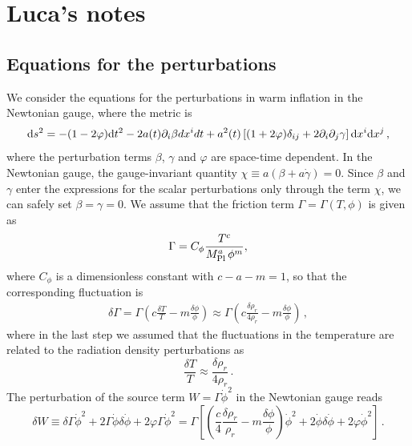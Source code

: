 \section{Luca's notes}

\subsection{Equations for the perturbations}

We consider the equations for the perturbations in warm inflation in the Newtonian gauge, where the metric is
\begin{equation}
    {\rm d}s^2 = -(1 - 2\varphi){\rm d}t^2 - 2 a(t) \partial_i\beta dx^i dt + a^2(t)\left[ (1+2\varphi)\delta_{ij} + 2\partial_i\partial_j \gamma \right]{\rm d}x^i {\rm d}x^j\,,
\end{equation}
where the perturbation terms $\beta$, $\gamma$ and $\varphi$ are space-time dependent. In the Newtonian gauge, the gauge-invariant quantity $\chi \equiv a(\beta + a\dot\gamma) = 0$. Since $\beta$ and $\gamma$ enter the expressions for the scalar perturbations only through the term $\chi$, we can safely set $\beta = \gamma = 0$. We assume that the friction term $\Gamma = \Gamma(T, \phi)$ is given as
\begin{align}
    \Gamma = C_\phi \frac{T^c}{M_{\rm Pl}^a\,\phi^m},
\end{align}
where $C_\phi$ is a dimensionless constant with $c-a-m=1$, so that the corresponding fluctuation is
\begin{align}
    \delta\Gamma = \Gamma \left( c\frac{\delta T}{T} - m\frac{\delta\phi}{\phi} \right) \approx \Gamma \left( c\frac{\delta \rho_r}{4\rho_r} - m\frac{\delta\phi}{\phi} \right)\,,
\end{align}
where in the last step we assumed that the fluctuations in the temperature are related to the radiation density perturbations as
\begin{equation}
	\frac{\delta T}{T} \approx \frac{\delta \rho_r}{4\rho_r}\,.
\end{equation}
The perturbation of the source term $W = \Gamma \dot\phi^2$ in the Newtonian gauge reads~\cite{Das:2020xmh, Bastero-Gil:2011rva}
\begin{equation}
	\delta W \equiv \delta\Gamma \dot\phi^2 + 2\Gamma\dot\phi\delta\dot\phi + 2\varphi\Gamma\dot\phi^2 =  \Gamma \left[\left(\frac{c}{4}\frac{\delta \rho_r}{\rho_r} - m \frac{\delta\phi}{\phi}\right) \dot\phi^2 + 2\dot\phi\delta\dot\phi + 2\varphi\dot\phi^2\right]\,.
\end{equation}
